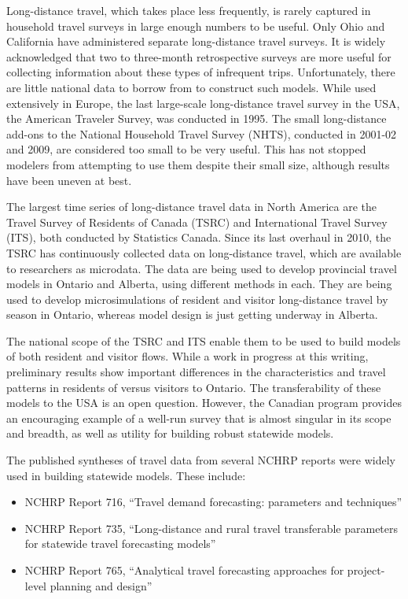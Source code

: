 Long-distance travel, which takes place less frequently, is rarely captured in household travel surveys in large enough numbers to be useful. Only Ohio and California have administered separate long-distance travel surveys. It is widely acknowledged that two to three-month retrospective surveys are more useful for collecting information about these types of infrequent trips. Unfortunately, there are little national data to borrow from to construct such models. While used extensively in Europe, the last large-scale long-distance travel survey in the USA, the American Traveler Survey, was conducted in 1995. The small long-distance add-ons to the National Household Travel Survey (NHTS), conducted in 2001-02 and 2009, are considered too small to be very useful. This has not stopped modelers from attempting to use them despite their small size, although results have been uneven at best.

The largest time series of long-distance travel data in North America are the Travel Survey of Residents of Canada (TSRC) and International Travel Survey (ITS), both conducted by Statistics Canada. Since its last overhaul in 2010, the TSRC has continuously collected data on long-distance travel, which are available to researchers as microdata. The data are being used to develop provincial travel models in Ontario and Alberta, using different methods in each. They are being used to develop microsimulations of resident and visitor long-distance travel by season in Ontario, whereas model design is just getting underway in Alberta.

The national scope of the TSRC and ITS enable them to be used to build models of both resident and visitor flows. While a work in progress at this writing, preliminary results show important differences in the characteristics and travel patterns in residents of versus visitors to Ontario. The transferability of these models to the USA is an open question. However, the Canadian program provides an encouraging example of a well-run survey that is almost singular in its scope and breadth, as well as utility for building robust statewide models.

The published syntheses of travel data from several NCHRP reports were widely used in building statewide models. These include:
\begin{itemize}
\item NCHRP Report 716, ``Travel demand forecasting: parameters and techniques'' \citep{cambridge12}
\item NCHRP Report 735, ``Long-distance and rural travel transferable parameters for statewide travel forecasting models'' \citep{schiffer12}
\item NCHRP Report 765, ``Analytical travel forecasting approaches for project-level planning and design'' \citep{cdmsmith14}
\end{itemize}

